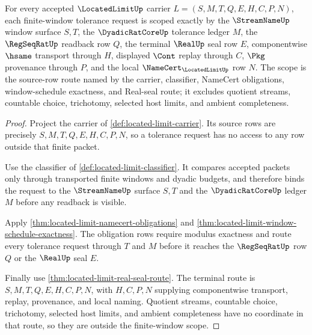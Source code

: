 \begin{theorem}
\label{thm:located-limit-finite-window-scope}
For every accepted $\LocatedLimitUp$ carrier $L=(S,M,T,Q,E,H,C,P,N)$, each finite-window tolerance request is scoped exactly by the $\StreamNameUp$ window surface $S,T$, the $\DyadicRatCoreUp$ tolerance ledger $M$, the $\RegSeqRatUp$ readback row $Q$, the terminal $\RealUp$ seal row $E$, componentwise $\hsame$ transport through $H$, displayed $\Cont$ replay through $C$, $\Pkg$ provenance through $P$, and the local $\NameCert_{\LocatedLimitUp}$ row $N$. The scope is the source-row route named by the carrier, classifier, NameCert obligations, window-schedule exactness, and Real-seal route; it excludes quotient streams, countable choice, trichotomy, selected host limits, and ambient completeness.
\end{theorem}
\begin{proof}
Project the carrier of \autoref{def:located-limit-carrier}. Its source rows are precisely $S,M,T,Q,E,H,C,P,N$, so a tolerance request has no access to any row outside that finite packet.

Use the classifier of \autoref{def:located-limit-classifier}. It compares accepted packets only through transported finite windows and dyadic budgets, and therefore binds the request to the $\StreamNameUp$ surface $S,T$ and the $\DyadicRatCoreUp$ ledger $M$ before any readback is visible.

Apply \autoref{thm:located-limit-namecert-obligations} and \autoref{thm:located-limit-window-schedule-exactness}. The obligation rows require modulus exactness and route every tolerance request through $T$ and $M$ before it reaches the $\RegSeqRatUp$ row $Q$ or the $\RealUp$ seal $E$.

Finally use \autoref{thm:located-limit-real-seal-route}. The terminal route is $S,M,T,Q,E,H,C,P,N$, with $H,C,P,N$ supplying componentwise transport, replay, provenance, and local naming. Quotient streams, countable choice, trichotomy, selected host limits, and ambient completeness have no coordinate in that route, so they are outside the finite-window scope.
\end{proof}

